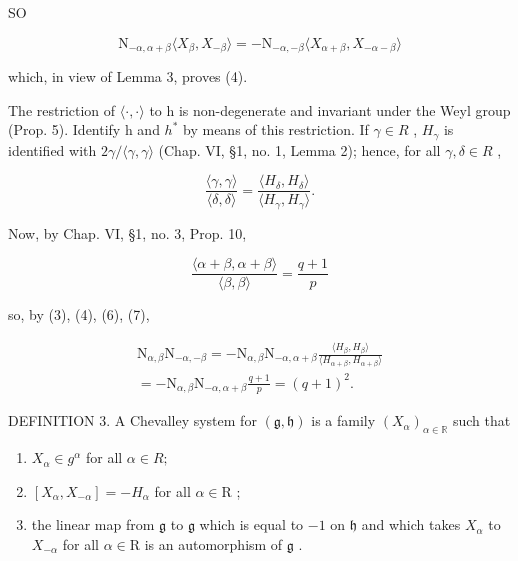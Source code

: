 SO

\[
\mathrm{N} _ {- \alpha , \alpha + \beta} \langle X _ {\beta}, X _ {- \beta} \rangle = - \mathrm{N} _ {- \alpha , - \beta} \langle X _ {\alpha + \beta}, X _ {- \alpha - \beta} \rangle
\]

which, in view of Lemma 3, proves (4).

The restriction of \(\langle\cdot,\cdot\rangle\) to h is non-degenerate and invariant under the Weyl group (Prop. 5). Identify h and \(h^{*}\) by means of this restriction. If \(\gamma\in R\) , \(H_{\gamma}\) is identified with \(2\gamma/\langle\gamma,\gamma\rangle\) (Chap. VI, §1, no. 1, Lemma 2); hence, for all \(\gamma,\delta\in R\) ,

\[
\frac {\langle \gamma , \gamma \rangle}{\langle \delta , \delta \rangle} = \frac {\langle H _ {\delta} , H _ {\delta} \rangle}{\langle H _ {\gamma} , H _ {\gamma} \rangle}.\tag{6}
\]

Now, by Chap. VI, §1, no. 3, Prop. 10,

\[
\frac {\langle \alpha + \beta , \alpha + \beta \rangle}{\langle \beta , \beta \rangle} = \frac {q + 1}{p}\tag{7}
\]

so, by (3), (4), (6), (7),

\[
\begin{array}{r} \mathrm{N} _ {\alpha , \beta} \mathrm{N} _ {- \alpha , - \beta} = - \mathrm{N} _ {\alpha , \beta} \mathrm{N} _ {- \alpha , \alpha + \beta} \frac {\langle H _ {\beta} , H _ {\beta} \rangle}{\langle H _ {\alpha + \beta} , H _ {\alpha + \beta} \rangle} \\ = - \mathrm{N} _ {\alpha , \beta} \mathrm{N} _ {- \alpha , \alpha + \beta} \frac {q + 1}{p} = (q + 1) ^ {2}. \end{array}
\]

DEFINITION 3. A Chevalley system for \((\mathfrak{g},\mathfrak{h})\) is a family \((X_{\alpha})_{\alpha \in \mathbb{R}}\) such that

\begin{enumerate}
\def\labelenumi{(\roman{enumi})}
\item
  \(X_{\alpha} \in g^{\alpha}\) for all \(\alpha \in R;\)
\item
  \([X_{\alpha}, X_{-\alpha}] = -H_{\alpha}\) for all \(\alpha \in \mathrm{R}\) ;
\item
  the linear map from \(\mathfrak{g}\) to \(\mathfrak{g}\) which is equal to \(-1\) on \(\mathfrak{h}\) and which takes \(X_{\alpha}\) to \(X_{-\alpha}\) for all \(\alpha \in \mathrm{R}\) is an automorphism of \(\mathfrak{g}\) .
\end{enumerate}


